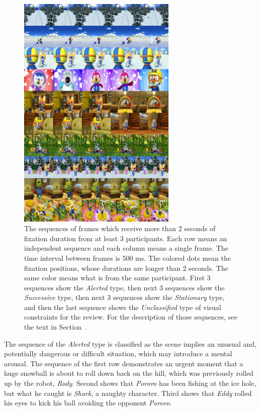\documentclass[oneside,master]{snueethesis}
\begin{document}
\begin{figure}
  \centerline{\includegraphics[width=76mm]{./eps/long_fixations_types.png}}
  \caption[The samples of sequence types]{The sequences of frames which receive more than 2 seconds of fixation duration from at least 3 participants. Each row means an independent sequence and each column means a single frame. The time interval between frames is 500 ms. The colored dots mean the fixation positions, whose durations are longer than 2 seconds. The same color means what is from the same participant. First 3 sequences show the \textit{Alerted} type, then next 3 sequences show the \textit{Successive} type, then next 3 sequences show the \textit{Stationary} type, and then the last sequence shows the \textit{Unclassified} type of visual constraints for the review. For the description of those sequences, see the text in Section~\textit{}.}
  \label{fig:long-fixations}
\end{figure}

The sequence of the \textit{Alerted} type is classified as the scene implies an unusual and, potentially dangerous or difficult situation, which may introduce a mental arousal. The sequence of the first row demonstrates an urgent moment that a huge snowball is about to roll down back on the hill, which was previously rolled up by the robot, \textit{Rody}. Second shows that \textit{Pororo} has been fishing at the ice hole, but what he caught is \textit{Shark}, a naughty character. Third shows that \textit{Eddy} rolled his eyes to kick his ball avoiding the opponent \textit{Pororo}.
\end{document}
